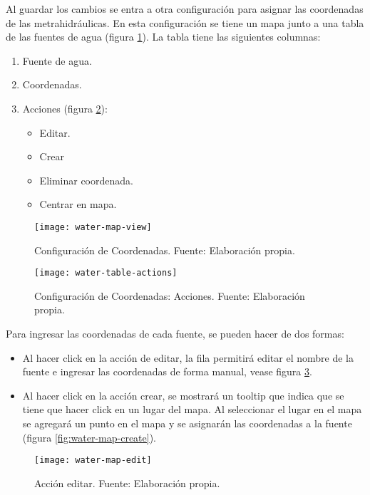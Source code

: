 Al guardar los cambios se entra a otra configuración para asignar las coordenadas de las metrahidráulicas.
En esta configuración se tiene un mapa junto a una tabla de las fuentes de agua (figura \ref{fig:water-map-view}). La tabla tiene las siguientes columnas:
\begin{enumerate}
    \item Fuente de agua.
    \item Coordenadas.
    \item Acciones (figura \ref{fig:water-table-actions}):
          \begin{itemize}
            \item Editar.
            \item Crear
            \item Eliminar coordenada.
            \item Centrar en mapa.
          \end{itemize}
\end{enumerate}

\begin{figure}[H]
	\centering
	\texttt{[image: water-map-view]}
	\caption{\label{fig:water-map-view} Configuración de Coordenadas. Fuente: Elaboración propia.}
\end{figure}

\begin{figure}[H]
	\centering
	\texttt{[image: water-table-actions]}
	\caption{\label{fig:water-table-actions} Configuración de Coordenadas: Acciones. Fuente: Elaboración propia.}
\end{figure}

Para ingresar las coordenadas de cada fuente, se pueden hacer de dos formas:
\begin{itemize}
    \item Al hacer click en la acción de editar, la fila permitirá editar el nombre de la fuente e ingresar las coordenadas de forma manual, vease figura \ref{fig:water-map-edit}.    
    \item Al hacer click en la acción crear, se mostrará un tooltip que indica que se tiene que hacer click en un lugar del mapa. Al seleccionar el lugar en el mapa se agregará un punto en el mapa y se asignarán las coordenadas a la fuente (figura \ref{fig:water-map-create}).
\end{itemize}

 \begin{figure}[H]
	\centering
	\texttt{[image: water-map-edit]}
	\caption{\label{fig:water-map-edit} Acción editar. Fuente: Elaboración propia.}
\end{figure}

